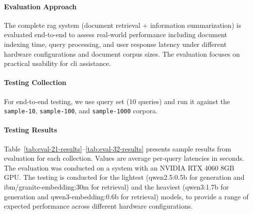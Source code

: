 \paragraph{Evaluation Approach}
The complete \gls{rag} system (document retrieval + information
summarization) is evaluated end-to-end to assess real-world
performance including document indexing time, query processing, and
user response latency under different hardware configurations and document
corpus sizes. The evaluation focuses on practical usability for \gls{cli}
assistance.

\paragraph{Testing Collection}{}
For end-to-end testing, we use query set (10 queries) and run it against the \texttt{sample-10}, \texttt{sample-100}, and \texttt{sample-1000} corpora.

\paragraph{Testing Results}{}
Table~\ref{tab:eval-21-results}--\ref{tab:eval-32-results} presents sample results from evaluation
for each collection. Values are average per-query latencies in seconds. The
evaluation was conducted on a system with an NVIDIA RTX 4060 8GB GPU. The testing
is conducted for the lightest (qwen2.5:0.5b for generation and
ibm/granite-embedding:30m for retrieval) and the heaviest (qwen3:1.7b for
generation and qwen3-embedding:0.6b for retrieval) models, to provide a range of
expected performance across different hardware configurations.

